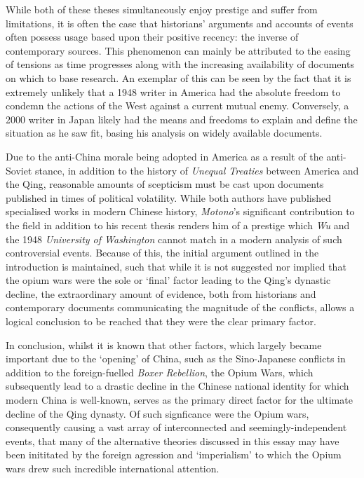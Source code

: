 \documentclass[a4paper,oneside]{article}
\begin{document}
While both of these theses simultaneously enjoy prestige and suffer from
limitations, it is often the case that historians' arguments and accounts of
events often possess usage based upon their positive recency: the inverse of
contemporary sources. This phenomenon can mainly be attributed to the easing of
tensions as time progresses along with the increasing availability of documents
on which to base research. An exemplar of this can be seen by the fact that it
is extremely unlikely that a 1948 writer in America had the absolute freedom to
condemn the actions of the West against a current mutual enemy. Conversely, a
2000 writer in Japan likely had the means and freedoms to explain and define the
situation as he saw fit, basing his analysis on widely available documents.

Due to the anti-China morale being adopted in America as a result of the
anti-Soviet stance, in addition to the history of \textit{Unequal Treaties}
between America and the Qing, reasonable amounts of scepticism must be cast upon
documents published in times of political volatility.  While both authors have
published specialised works in modern Chinese history, \textit{Motono}'s
significant contribution to the field in addition to his recent thesis renders
him of a prestige which \textit{Wu} and the 1948 \textit{University of
Washington} cannot match in a modern analysis of such controversial events.
Because of this, the initial argument outlined in the introduction is
maintained, such that while it is not suggested nor implied that the opium wars
were the sole or `final' factor leading to the Qing's dynastic decline, the
extraordinary amount of evidence, both from historians and contemporary
documents communicating the magnitude of the conflicts, allows a logical
conclusion to be reached that they were the clear primary factor.

In conclusion, whilst it is known that other factors, which largely became
important due to the `opening' of China, such as the Sino-Japanese conflicts in
addition to the foreign-fuelled \textit{Boxer Rebellion}, the Opium Wars, which
subsequently lead to a drastic decline in the Chinese national identity for
which modern China is well-known, serves as the primary direct factor for the
ultimate decline of the Qing dynasty. Of such signficance were the Opium wars,
consequently causing a vast array of interconnected and seemingly-independent
events, that many of the alternative theories discussed in this essay may have
been inititated by the foreign agression and `imperialism' to which the Opium
wars drew such incredible international attention.
\end{document}
